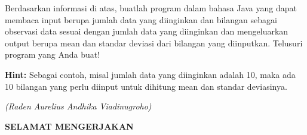 \documentclass{article}
\begin{document}
\begin{enumerate}
    Berdasarkan informasi di atas, buatlah program dalam bahasa Java yang dapat membaca input berupa jumlah data yang diinginkan dan bilangan sebagai observasi data sesuai dengan jumlah data yang diinginkan dan mengeluarkan output berupa mean dan standar deviasi dari bilangan yang diinputkan. Telusuri program yang Anda buat!
    
    \textbf{Hint:} Sebagai contoh, misal jumlah data yang diinginkan adalah 10, maka ada 10 bilangan yang perlu diinput untuk dihitung mean dan standar deviasinya.
    
    \begin{flushright}
    \textit{(Raden Aurelius Andhika Viadinugroho)}
    \end{flushright}
    
\end{enumerate}

    \begin{center}
        \textbf{SELAMAT MENGERJAKAN}
    \end{center}
\end{document}
